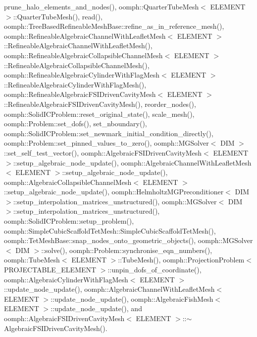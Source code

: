 prune\+\_\+halo\+\_\+elements\+\_\+and\+\_\+nodes(), oomph\+::\+Quarter\+Tube\+Mesh$<$ E\+L\+E\+M\+E\+N\+T $>$\+::\+Quarter\+Tube\+Mesh(), read(), oomph\+::\+Tree\+Based\+Refineable\+Mesh\+Base\+::refine\+\_\+as\+\_\+in\+\_\+reference\+\_\+mesh(), oomph\+::\+Refineable\+Algebraic\+Channel\+With\+Leaflet\+Mesh$<$ E\+L\+E\+M\+E\+N\+T $>$\+::\+Refineable\+Algebraic\+Channel\+With\+Leaflet\+Mesh(), oomph\+::\+Refineable\+Algebraic\+Collapsible\+Channel\+Mesh$<$ E\+L\+E\+M\+E\+N\+T $>$\+::\+Refineable\+Algebraic\+Collapsible\+Channel\+Mesh(), oomph\+::\+Refineable\+Algebraic\+Cylinder\+With\+Flag\+Mesh$<$ E\+L\+E\+M\+E\+N\+T $>$\+::\+Refineable\+Algebraic\+Cylinder\+With\+Flag\+Mesh(), oomph\+::\+Refineable\+Algebraic\+F\+S\+I\+Driven\+Cavity\+Mesh$<$ E\+L\+E\+M\+E\+N\+T $>$\+::\+Refineable\+Algebraic\+F\+S\+I\+Driven\+Cavity\+Mesh(), reorder\+\_\+nodes(), oomph\+::\+Solid\+I\+C\+Problem\+::reset\+\_\+original\+\_\+state(), scale\+\_\+mesh(), oomph\+::\+Problem\+::set\+\_\+dofs(), set\+\_\+nboundary(), oomph\+::\+Solid\+I\+C\+Problem\+::set\+\_\+newmark\+\_\+initial\+\_\+condition\+\_\+directly(), oomph\+::\+Problem\+::set\+\_\+pinned\+\_\+values\+\_\+to\+\_\+zero(), oomph\+::\+M\+G\+Solver$<$ D\+I\+M $>$\+::set\+\_\+self\+\_\+test\+\_\+vector(), oomph\+::\+Algebraic\+F\+S\+I\+Driven\+Cavity\+Mesh$<$ E\+L\+E\+M\+E\+N\+T $>$\+::setup\+\_\+algebraic\+\_\+node\+\_\+update(), oomph\+::\+Algebraic\+Channel\+With\+Leaflet\+Mesh$<$ E\+L\+E\+M\+E\+N\+T $>$\+::setup\+\_\+algebraic\+\_\+node\+\_\+update(), oomph\+::\+Algebraic\+Collapsible\+Channel\+Mesh$<$ E\+L\+E\+M\+E\+N\+T $>$\+::setup\+\_\+algebraic\+\_\+node\+\_\+update(), oomph\+::\+Helmholtz\+M\+G\+Preconditioner$<$ D\+I\+M $>$\+::setup\+\_\+interpolation\+\_\+matrices\+\_\+unstructured(), oomph\+::\+M\+G\+Solver$<$ D\+I\+M $>$\+::setup\+\_\+interpolation\+\_\+matrices\+\_\+unstructured(), oomph\+::\+Solid\+I\+C\+Problem\+::setup\+\_\+problem(), oomph\+::\+Simple\+Cubic\+Scaffold\+Tet\+Mesh\+::\+Simple\+Cubic\+Scaffold\+Tet\+Mesh(), oomph\+::\+Tet\+Mesh\+Base\+::snap\+\_\+nodes\+\_\+onto\+\_\+geometric\+\_\+objects(), oomph\+::\+M\+G\+Solver$<$ D\+I\+M $>$\+::solve(), oomph\+::\+Problem\+::synchronise\+\_\+eqn\+\_\+numbers(), oomph\+::\+Tube\+Mesh$<$ E\+L\+E\+M\+E\+N\+T $>$\+::\+Tube\+Mesh(), oomph\+::\+Projection\+Problem$<$ P\+R\+O\+J\+E\+C\+T\+A\+B\+L\+E\+\_\+\+E\+L\+E\+M\+E\+N\+T $>$\+::unpin\+\_\+dofs\+\_\+of\+\_\+coordinate(), oomph\+::\+Algebraic\+Cylinder\+With\+Flag\+Mesh$<$ E\+L\+E\+M\+E\+N\+T $>$\+::update\+\_\+node\+\_\+update(), oomph\+::\+Algebraic\+Channel\+With\+Leaflet\+Mesh$<$ E\+L\+E\+M\+E\+N\+T $>$\+::update\+\_\+node\+\_\+update(), oomph\+::\+Algebraic\+Fish\+Mesh$<$ E\+L\+E\+M\+E\+N\+T $>$\+::update\+\_\+node\+\_\+update(), and oomph\+::\+Algebraic\+F\+S\+I\+Driven\+Cavity\+Mesh$<$ E\+L\+E\+M\+E\+N\+T $>$\+::$\sim$\+Algebraic\+F\+S\+I\+Driven\+Cavity\+Mesh().

